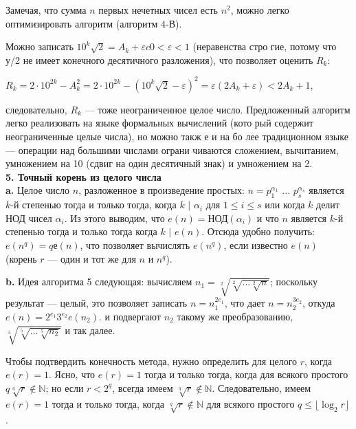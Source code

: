 Замечая,  что сумма $n$
  первых  нечетных  чисел  есть  $n^{2}$, можно легко 
оптимизировать алгоритм  (алгоритм 4-В).

Можно  записать  $10^{k}\sqrt{2} =  A_{k} + \varepsilon c 0 < \varepsilon <  1 $  (неравенства  стро­
гие,  потому  что 
у/2
 не  имеет  конечного  десятичного  разложения),  что 
позволяет оценить $R_{k}$:
\begin{center}
$R_{k} = 2 \cdot 10^{2k} - A_{k}^{2} =  2 \cdot 10^{2k} - (10^{k}\sqrt{2} - \varepsilon)^{2} = \varepsilon(2A_{k} + \varepsilon) < 2A_{k} + 1$,
\end{center}
следовательно, $R_{k}$ —
 тоже неограниченное  целое число.  Предложенный 
алгоритм легко  реализовать  на языке  формальных  вычислений  (кото­
рый  содержит неограниченные  целые  числа),  но  можно такж е  и  на бо­
лее  традиционном  языке  —  операции  над  большими  числами  ограни­
чиваются  сложением,  вычитанием,  умножением  на  10  (сдвиг  на  один 
десятичный  знак)  и  умножением  на 2.\\

\noindent
\textbf{5. Точный корень из целого числа}\\

\textbf{a.} Целое число $n$, разложенное в произведение простых: $n=p_{1}^{\alpha_{1}}$ ... $p_{s}^{\alpha_{s}}$
является $k$-й степенью  тогда и только тогда, когда $k\text{ | }\alpha_{i}$ для $1 \leqslant i \leqslant s$
или когда $k$ делит НОД чисел $\alpha_{i}$. Из  этого  выводим,  что $e(n) =  \text{НОД}(\alpha_{i})$  и  что $n$ является 
$k$-й степенью  тогда и  только  тогда  
когда $k\text{ | }e(n)$.  Отсюда  удобно  получить:  $e(n^{q}) =  qе(n)$,  что  позволяет 
вычислять  $e(n^{q})$,  если  известно  $e(n)$  (корень  $r$  —  один  и  тот   же  для $n$ и $n^{q}$).

\textbf{b.} Идея алгоритма 5 следующая: вычисляем $n_{1} = \sqrt[2]{\sqrt[2]{...\sqrt[2]{n}}}$;
по­скольку результат — целый, это позволяет записать $n=n_{1}^{2e_{1}}$, что дает
$n=n_{2}^{3e_{2}}$, откуда $e(n) = 2^{e_{1}}3^{e_{2}}e(n_{2})$. 
и  подвергают $n_{2}$
такому  же преобразованию, $\sqrt[5]{\sqrt[5]{...\sqrt[5]{n_{2}}}}$ и так далее.
\newpage

Чтобы подтвердить конечность метода, нужно определить для целого $r$,
когда $e(r) = 1$. Ясно, что $e(r) = 1$ тогда и только тогда, когда для всякого
простого $q \sqrt[q]{r} \notin \mathbb{N}$; но если $r < 2^q$, всегда имеем $\sqrt[q]{r} \notin \mathbb{N}$.
Следовательно, имеем $e(r) = 1$ тогда и только тогда, когда $\sqrt[q]{r} \notin \mathbb{N}$ для всякого простого $q \leqslant \lfloor\log_2{r}\rfloor$.

